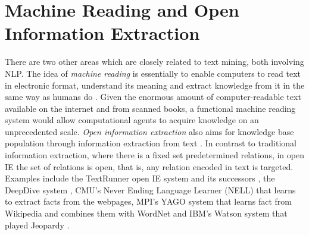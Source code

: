 \section{Machine Reading and Open Information Extraction}

There are two other areas which are closely related to text mining, both involving NLP.
The idea of \emph{machine reading} is essentially to enable computers to read text in electronic format, understand its meaning and extract knowledge from it in the same way as humans do \citep{Mitchell2005Reading}.
Given the enormous amount of computer-readable text available on the internet and from scanned books, a functional machine reading system would allow computational agents to acquire knowledge on an unprecedented scale.
\emph{Open information extraction} also aims for knowledge base population through information extraction from text \citet{banko2007open,Etzioni2011Search}.
In contrast to traditional information extraction, where there is a fixed set predetermined relations, in open IE the set of relations is open, that is, any relation encoded in text is targeted.  
Examples include the TextRunner open IE system and its successors \citep{yates2007textrunner}, the DeepDive system \citep{niu2012deepdive}, CMU's Never Ending Language Learner (NELL) \citep{carlson-aaai} that learns to extract facts from the webpages,  MPI's YAGO system that learns fact from Wikipedia and combines them with WordNet \citep{YAGO} and IBM's Watson system that played Jeopardy \citep{fan2012automatic}.




 